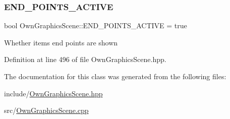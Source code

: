\subsubsection{\texorpdfstring{E\+N\+D\+\_\+\+P\+O\+I\+N\+T\+S\+\_\+\+A\+C\+T\+I\+VE}{END\_POINTS\_ACTIVE}}
{\footnotesize\ttfamily bool Own\+Graphics\+Scene\+::\+E\+N\+D\+\_\+\+P\+O\+I\+N\+T\+S\+\_\+\+A\+C\+T\+I\+VE = true\hspace{0.3cm}{\ttfamily [static]}}

Whether items end points are shown 

Definition at line 496 of file Own\+Graphics\+Scene.\+hpp.



The documentation for this class was generated from the following files\+:\begin{DoxyCompactItemize}
\item 
include/\mbox{\hyperlink{OwnGraphicsScene_8hpp}{Own\+Graphics\+Scene.\+hpp}}\item 
src/\mbox{\hyperlink{OwnGraphicsScene_8cpp}{Own\+Graphics\+Scene.\+cpp}}\end{DoxyCompactItemize}
